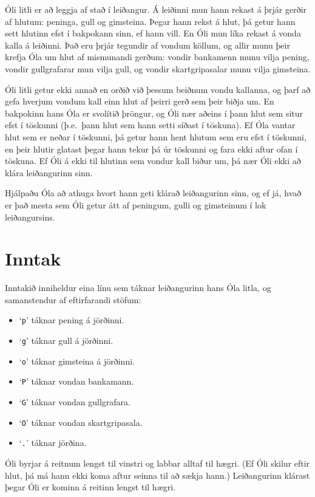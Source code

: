 Óli litli er að leggja af stað í leiðangur. Á leiðinni mun hann rekast á þrjár
gerðir af hlutum: peninga, gull og gimsteina. Þegar hann rekst á hlut, þá getur
hann sett hlutinn efst í bakpokann sinn, ef hann vill. En Óli mun líka rekast á
vonda kalla á leiðinni. Það eru þrjár tegundir af vondum köllum, og allir munu
þeir krefja Óla um hlut af mismunandi gerðum: vondir bankamenn munu vilja
pening, vondir gullgrafarar mun vilja gull, og vondir skartgripasalar munu
vilja gimsteina.

Óli litli getur ekki annað en orðið við þessum beiðnum vondu kallanna, og þarf
að gefa hverjum vondum kall einn hlut af þeirri gerð sem þeir biðja um. En
bakpokinn hans Óla er svolítið þröngur, og Óli nær aðeins í þann hlut sem situr
efst í töskunni (þ.e.\ þann hlut sem hann setti síðast í töskuna). Ef Óla
vantar hlut sem er neðar í töskunni, þá getur hann hent hlutum sem eru efst í
töskunni, en þeir hlutir glatast þegar hann tekur þá úr töskunni og fara ekki
aftur ofan í töskuna. Ef Óli á ekki til hlutinn sem vondur kall biður um, þá
nær Óli ekki að klára leiðangurinn sinn.

Hjálpaðu Óla að athuga hvort hann geti klárað leiðangurinn sinn, og ef já, hvað
er það mesta sem Óli getur átt af peningum, gulli og gimsteinum í lok
leiðangursins.

\section*{Inntak}
Inntakið inniheldur eina línu sem táknar leiðangurinn hans Óla litla, og
samanstendur af eftirfarandi stöfum:
\begin{itemize}
    \item `\texttt{p}' táknar pening á jörðinni.
    \item `\texttt{g}' táknar gull á jörðinni.
    \item `\texttt{o}' táknar gimsteina á jörðinni.
    \item `\texttt{P}' táknar vondan bankamann.
    \item `\texttt{G}' táknar vondan gullgrafara.
    \item `\texttt{O}' táknar vondan skartgripasala.
    \item `\texttt{.}' táknar jörðina.
\end{itemize}

Óli byrjar á reitnum lengst til vinstri og labbar alltaf til hægri. (Ef Óli
skilur eftir hlut, þá má hann ekki koma aftur seinna til að sækja hann.)
Leiðangurinn klárast þegar Óli er kominn á reitinn lengst til hægri.

